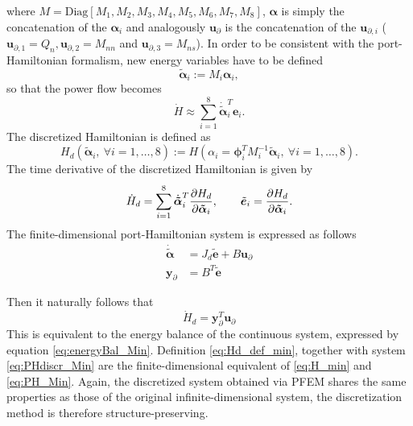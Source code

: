 \documentclass[preprint,12pt]{elsarticle}
\begin{document}
where $M = \text{Diag}[M_1,M_2,M_3,M_4,M_5,M_6,M_7,M_8]$, $\bm{\alpha}$ is simply the concatenation of the $\bm\alpha_i$ and analogously $\bm{u}_{\partial}$ is the concatenation of the $\bm{u}_{\partial, i}$ ($\bm{u}_{\partial, 1}= Q_n, \bm{u}_{\partial, 2}= M_{nn}$ and $\bm{u}_{\partial, 3}= M_{ns}$). 
In order to be consistent with the port-Hamiltonian formalism, new energy variables have to be defined
\begin{equation}
\bm{\tilde{\alpha}}_i := M_i \bm{\alpha}_i,
\end{equation}
so that the power flow becomes
\begin{equation}
\dot{H} \approx \sum_{i=1}^8 \dot{\bm{\tilde{\alpha}}}_i^T \bm{e}_i.
\end{equation}
The discretized Hamiltonian is defined as
\begin{equation}
\label{eq:Hd_def_min}
H_d(\bm{\tilde{\alpha}}_i,\ \forall i=1,\dots, 8) := H(\alpha_i= \bm\phi_i^T M_i^{-1} \bm{\tilde{\alpha}}_i,\ \forall i=1,\dots, 8).
\end{equation}
The time derivative of the discretized Hamiltonian is given by
\begin{equation}
\label{eq:derHd_Min}
\dot{H}_d = \sum_{i=1}^8 \dot{\bm{\tilde{\alpha}}}_i^T \diffp{H_d}{\bm{\tilde{\alpha}}_i}, \qquad \tilde{\bm{e}}_i = \diffp{H_d}{\bm{\tilde{\alpha}}_i}.
\end{equation} 
The finite-dimensional port-Hamiltonian system is expressed as follows
\begin{equation}
\begin{aligned}
\label{eq:PHdiscr_Min}
\dot{\bm{\tilde{\alpha}}} &= J_d \tilde{\bm{e}} + B \bm{u}_{\partial} \\
\bm{y}_{\partial} &= B^T \tilde{\bm{e}}
\end{aligned}
\end{equation}

Then it naturally follows that
\begin{equation}
\dot{H}_d = \bm{y}_{\partial}^T \bm{u}_{\partial}
\end{equation}
This is equivalent to the energy balance of the continuous system, expressed by equation \eqref{eq:energyBal_Min}. Definition \eqref{eq:Hd_def_min}, together with system \eqref{eq:PHdiscr_Min} are the finite-dimensional equivalent of \eqref{eq:H_min} and  \eqref{eq:PH_Min}. Again, the discretized system obtained via PFEM shares the same properties as those of the original infinite-dimensional system, the discretization method is therefore structure-preserving. \\
\end{document}

